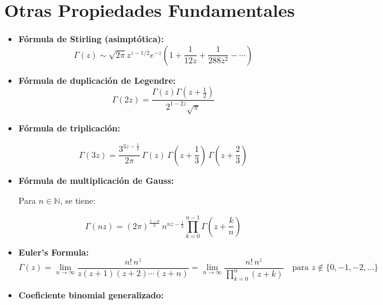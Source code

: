 
\section{ Otras Propiedades Fundamentales}

\begin{itemize}


	\item \textbf{Fórmula de Stirling (asimptótica):}
	      \[
		      \Gamma(z) \sim \sqrt{2\pi} z^{z - 1/2} e^{-z} \left( 1 + \frac{1}{12z} + \frac{1}{288z^2} - \cdots \right)
	      \]
	\item \textbf{Fórmula de duplicación de Legendre:}
	      \[
		      \Gamma(2z) = \frac{\Gamma(z)\Gamma\left(z + \tfrac{1}{2} \right)}{2^{1 - 2z} \sqrt{\pi}}
	      \]

	\item \textbf{Fórmula de triplicación:}

	      \[
		      \Gamma(3z) = \frac{3^{3z - \frac{1}{2}}}{2\pi} \, \Gamma(z) \, \Gamma\left(z + \frac{1}{3} \right) \, \Gamma\left(z + \frac{2}{3} \right)
	      \]

	\item \textbf{Fórmula de multiplicación de Gauss:}

	      Para \( n \in \mathbb{N} \), se tiene:

	      \[
		      \Gamma(nz) = (2\pi)^{\frac{1-n}{2}} \, n^{nz - \frac{1}{2}} \prod_{k=0}^{n-1} \Gamma\left(z + \frac{k}{n} \right)
	      \]

	\item \textbf{Euler's Formula:}
	      \[
		      \Gamma(z) = \lim_{n \to \infty} \frac{n! \, n^z}{z (z+1) (z+2) \cdots (z+n)} = \lim_{n \to \infty} \frac{n! \, n^z}{\prod_{k=0}^{n} (z + k)}
		      \quad \text{para } z \notin \{0, -1, -2, \dots\}
	      \]


	\item \textbf{Coeficiente binomial generalizado:}


\end{itemize}
